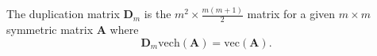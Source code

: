 The duplication matrix $\mathbf{D}_{m}$
is the $m^2 \times \frac{m \left( m + 1 \right)}{2}$ matrix
for a given $m \times m$ symmetric matrix $\mathbf{A}$
where
\begin{equation}
   \mathbf{D}_{m} \mathrm{vech} \left( \mathbf{A} \right)
   =
   \mathrm{vec} \left( \mathbf{A} \right) .
\end{equation}
